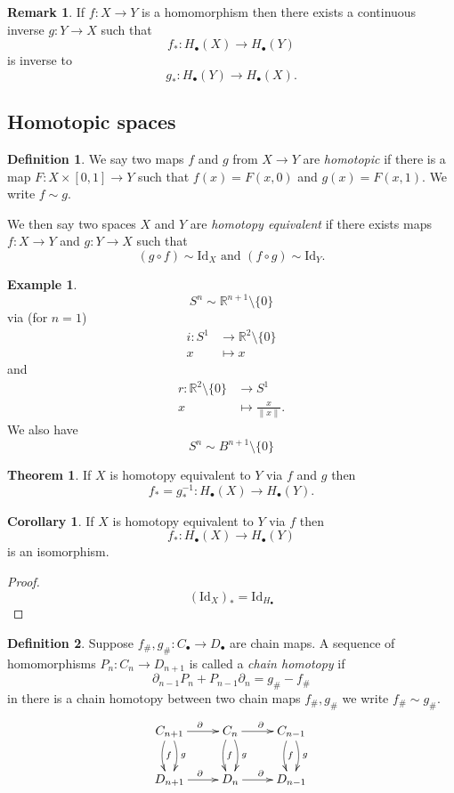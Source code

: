 \documentclass[12pt]{article}
\theoremstyle{definition}
\newtheorem*{thm}{Theorem}
\newtheorem*{cor}{Corollary}
\theoremstyle{definition}
\newtheorem*{defn}{Definition}
\newtheorem*{ex}{Example}
\newtheorem*{rmk}{Remark}
\newcommand{\RR}{\mathbb{R}}
\newcommand{\C}{C_\bullet}
\renewcommand{\H}{H_\bullet}
\begin{document}
\begin{rmk}
If $f\colon X \to Y$ is a homomorphism then there exists a continuous inverse $g\colon Y \to X$ such that
\[
f_* \colon \H(X) \to \H(Y)
\]
is inverse to
\[
g_* \colon \H(Y) \to \H(X).
\]
\end{rmk}

\subsection{Homotopic spaces}
\begin{defn}
We say two maps $f$ and $g$ from $X \to Y$ are \emph{homotopic} if there is a map $F\colon X\times [0,1] \to Y$ such that
$f(x) = F(x,0)$ and $g(x) = F(x,1)$.
We write $f\sim g$.

We then say two spaces $X$ and $Y$ are \emph{homotopy equivalent} if there exists maps $f\colon X\to Y$ and $g\colon Y \to X$ such that
\[
(g\circ f) \sim \mathrm{Id}_X \text{ and } (f\circ g) \sim \mathrm{Id}_Y.
\]
\end{defn}

\begin{ex}
\[
S^n \sim \RR^{n+1}\setminus\{0\}
\]
via (for $n=1$)
\begin{align*}
i\colon S^1 &\to \RR^2\setminus\{0\}\\
x&\mapsto x
\end{align*}
and
\begin{align*}
r\colon \RR^2\setminus\{0\}&\to S^1\\
x&\mapsto \frac{x}{\| x\|}.
\end{align*}
We also have
\[
S^n \sim B^{n+1}\setminus\{0\}
\]
\end{ex}

\begin{thm}
If $X$ is homotopy equivalent to $Y$ via $f$ and $g$ then 
\[
f_* = g_*^{-1}\colon \H(X) \to \H(Y).
\]
\end{thm}
\begin{cor}
If $X$ is homotopy equivalent to $Y$ via $f$ then 
\[
f_* \colon \H(X) \to \H(Y)
\]
is an isomorphism.
\end{cor}
\begin{proof}
\[
(\mathrm{Id}_X)_* = \mathrm{Id}_{\H}
\]
\end{proof}

\begin{defn}
Suppose $f_\#,g_\#\colon\C \to D_\bullet$ are chain maps.
A sequence of homomorphisms $P_n\colon C_n \to D_{n+1}$ is called a \emph{chain homotopy} if
\[
\partial_{n-1} P_n + P_{n-1} \partial_n = g_\# - f_\#
\]
in there is a chain homotopy between two chain maps $f_\#,g_\#$ we write $f_\# \sim g_\#$.
\[
\xymatrix{
C_{n+1} \ar[r]^\partial \ar@/_/[d]^f\ar@/^/[d]^g & C_n \ar@/_/[d]^f\ar@/^/[d]^g\ar[r]^\partial & C_{n-1} \ar@/_/[d]^f\ar@/^/[d]^g\\
D_{n+1} \ar[r]^\partial  & D_n \ar[r]^\partial & D_{n-1}
}
\]
\end{defn}
\end{document}
